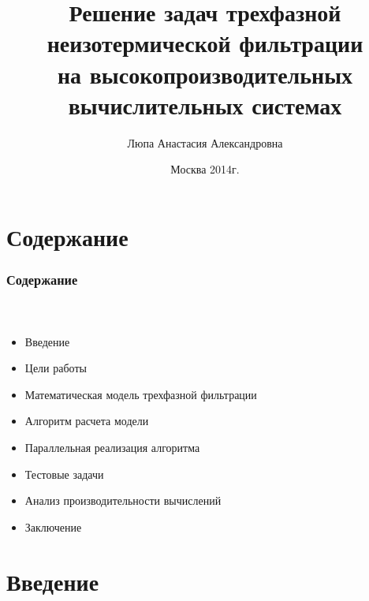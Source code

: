 \documentclass[10pt,pdf,hyperref={unicode}]{beamer} %
\title{ Решение задач трехфазной неизотермической фильтрации \\
на высокопроизводительных вычислительных системах}
\author{Люпа Анастасия Александровна}
\institute{Московский физико-технический институт \\
(государственный университет)\\
Факультет управления и прикладной математики \\
Кафедра математического моделирования \\
    \vspace{0.2cm}
    Научный руководитель: с.н.с., к.ф.-м.н. Чурбанова Н.Г.\\
}
\date{
    Москва 2014г.
}
\begin{document}
\begin{frame}
  \maketitle
\end{frame}

\section{Содержание}

\begin{frame}
\begin{center}
\frametitle{Содержание}
\framesubtitle{\ }
\begin{itemize}
\item {\large Введение}
\vspace{0.3cm}
\item {\large Цели работы}
\vspace{0.3cm}
\item {\large Математическая модель трехфазной фильтрации}
\vspace{0.3cm}
\item {\large Алгоритм расчета модели}
\vspace{0.3cm}
\item {\large Параллельная реализация алгоритма}
\vspace{0.3cm}
\item {\large Тестовые задачи}
\vspace{0.3cm}
\item {\large Анализ производительности вычислений}
\vspace{0.3cm}
\item {\large Заключение}
\end{itemize}
\end{center}
\end{frame}

\section{Введение}
\end{document}
